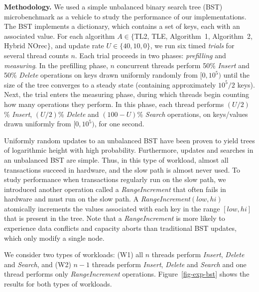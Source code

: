 \vspace{1mm}\noindent\textbf{Methodology.}
We used a simple unbalanced binary search tree (BST) microbenchmark as a vehicle to study the performance of our implementations.
The BST implements a dictionary, which contains a set of keys, each with an associated value.
For each algorithm $A \in \{$TL2, TLE, Algorithm~1, Algorithm~2, Hybrid NOrec$\}$, and update rate $U \in \{40, 10, 0\}$, we run six timed \textit{trials} for several thread counts $n$.
Each trial proceeds in two phases: \textit{prefilling} and \textit{measuring}.
In the prefilling phase, $n$ concurrent threads perform 50\% \textit{Insert} and 50\% \textit{Delete} operations on keys drawn uniformly randomly from $[0, 10^5)$ until the size of the tree converges to a steady state (containing approximately $10^5/2$ keys).
Next, the trial enters the measuring phase, during which threads begin counting how many operations they perform.
In this phase, each thread performs $(U/2)$\% \textit{Insert}, $(U/2)$\% \textit{Delete} and $(100-U)$\% \textit{Search} operations, on keys/values drawn uniformly from $[0,10^5)$, for one second.

Uniformly random updates to an unbalanced BST have been proven to yield trees of logarithmic height with high probability.
Furthermore, updates and searches in an unbalanced BST are simple.
Thus, in this type of workload, almost all transactions succeed in hardware, and the slow path is almost never used.
To study performance when transactions regularly run on the slow path, we introduced another operation called a \textit{RangeIncrement} that often fails in hardware and must run on the slow path.
A \textit{RangeIncrement}$(low, hi)$ atomically increments the values associated with each key in the range $[low, hi]$ that is present in the tree.
Note that a \textit{RangeIncrement} is more likely to experience data conflicts and capacity aborts than traditional BST updates, which only modify a single node.

We consider two types of workloads: (W1) all $n$ threads perform \textit{Insert}, \textit{Delete} and \textit{Search}, and (W2) $n-1$ threads perform \textit{Insert}, \textit{Delete} and \textit{Search} and one thread performs only \textit{RangeIncrement} operations.
Figure~\ref{fig-exp-bst} shows the results for both types of workloads.

